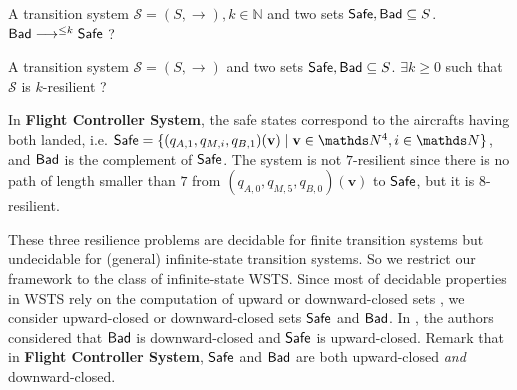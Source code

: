 {A transition system $\mathscr{S}=(S,\rightarrow), k \in \mathbb{N}$ and two sets $\Safe, \Bad \subseteq S$.}
{$\Bad \longrightarrow^{\leq k} \Safe$ ?\newline}

{A transition system $\mathscr{S}=(S,\rightarrow)$ and two sets $\Safe, \Bad \subseteq S$.}
{$\exists k \geq 0$ such that $\mathscr{S}$ is %
 $k$-resilient ?\newline}


\iffalse

\problemx{Resilience problems}
{A transition system $\mathscr{S}=(S,\rightarrow)$, two sets $\Safe, \Bad \subseteq S$, $k \in \mathbb{N}$.}
{ ({\sc resilience problem (RP)}) $\Bad \longrightarrow^{*} \Safe$ ?\newline  
({\sc $k$-resilience problem (kRP)})		$\Bad \longrightarrow^{\leq k} \Safe$ ?\newline
({\sc bounded resilience problem (BRP)})	$\exists k \geq 0$ such that $\mathscr{S}$ is 
 $k$-resilient ?\newline}

\fi


In {\bf Flight Controller System}, the safe states correspond to the aircrafts having both landed, i.e.
$\Safe = \{(q_{A,1}, q_{M,i}, q_{B,1})(\textbf{v}) \mid \textbf{v} \in \N^4, i \in \N\}$,
and $\Bad$ is the complement of $\Safe$. 
The system is not $7$-resilient since there is no path of length smaller than $7$ from $(q_{A,0}, q_{M,5}, q_{B,0})(\textbf{v})$ to $\Safe$, but it is $8$-resilient.

\iffalse
\begin{example}
Let us consider a VASS with only one state $q$, one counter, and one transition that substracts $-1$ from the counter, with $\Safe = \downarrow q(0)$, $\Bad = \uparrow q(1)$,
then resilience hold but not bounded resilience: for every bound $k$ there is an element of $\Bad$ e.g. $q(k+1)$ which necessitate at least $k+1$ steps before it can reach $\Safe$. 
\end{example}
\fi


  
These three resilience problems are decidable for finite transition systems but undecidable for (general) infinite-state transition systems. So we restrict our framework to the class of infinite-state WSTS. Since most of decidable properties in WSTS rely on the computation of upward or downward-closed sets \cite{DBLP:journals/iandc/AbdullaCJT00, DBLP:journals/tcs/FinkelS01}, we consider upward-closed or downward-closed sets $\Safe$ and $\Bad$. In \cite{DBLP:journals/corr/abs-2108-00889}, the authors considered that $\Bad$ is downward-closed and $\Safe$ is upward-closed. %
Remark that in {\bf Flight Controller System}, $\Safe$ and $\Bad$ are both upward-closed \emph{and} downward-closed.

